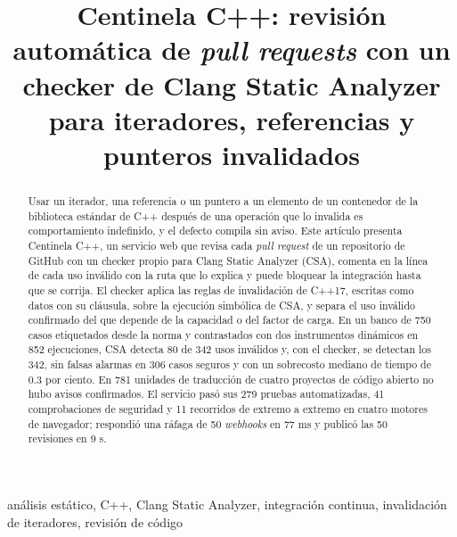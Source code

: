 \documentclass[conference]{IEEEtran}
\begin{document}
\title{Centinela C++: revisión automática de \textit{pull requests} con un checker de Clang Static Analyzer para iteradores, referencias y punteros invalidados}

\author{
\and
{}
}

\maketitle

\begin{abstract}
Usar un iterador, una referencia o un puntero a un elemento de un contenedor de la biblioteca estándar de C++ después de una operación que lo invalida es comportamiento indefinido, y el defecto compila sin aviso. Este artículo presenta Centinela C++, un servicio web que revisa cada \textit{pull request} de un repositorio de GitHub con un checker propio para Clang Static Analyzer (CSA), comenta en la línea de cada uso inválido con la ruta que lo explica y puede bloquear la integración hasta que se corrija. El checker aplica las reglas de invalidación de C++17, escritas como datos con su cláusula, sobre la ejecución simbólica de CSA, y separa el uso inválido confirmado del que depende de la capacidad o del factor de carga. En un banco de 750 casos etiquetados desde la norma y contrastados con dos instrumentos dinámicos en 852 ejecuciones, CSA detecta 80 de 342 usos inválidos y, con el checker, se detectan los 342, sin falsas alarmas en 306 casos seguros y con un sobrecosto mediano de tiempo de 0.3 por ciento. En 781 unidades de traducción de cuatro proyectos de código abierto no hubo avisos confirmados. El servicio pasó sus 279 pruebas automatizadas, 41 comprobaciones de seguridad y 11 recorridos de extremo a extremo en cuatro motores de navegador; respondió una ráfaga de 50 \textit{webhooks} en 77 ms y publicó las 50 revisiones en 9 s.
\end{abstract}

\begin{IEEEkeywords}
análisis estático, C++, Clang Static Analyzer, integración continua, invalidación de iteradores, revisión de código
\end{IEEEkeywords}
\end{document}
